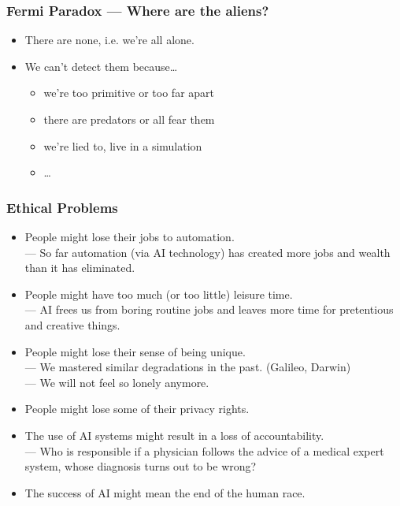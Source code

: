 \documentclass[UTF8,11pt,colorlinks,compress,openany]{beamer}%
\begin{document}
\begin{frame}\frametitle{Fermi Paradox --- Where are the aliens?}
\begin{itemize}
	\item There are none, i.e. we're all alone.
	\item We can't detect them because\dots
		\begin{itemize}
			\item we're too primitive or too far apart
			\item there are predators or all fear them
			\item we're lied to, live in a simulation
			\item \dots
		\end{itemize}
\end{itemize}
\end{frame}

\begin{frame}\frametitle{Ethical Problems}
\begin{itemize}
	\item People might lose their jobs to automation.\\
	--- So far automation (via AI technology) has created more jobs and wealth than it has eliminated.
	\item People might have too much (or too little) leisure time.\\
	--- AI frees us from boring routine jobs and leaves more time for pretentious and creative things.
	\item People might lose their sense of being unique.\\
	--- We mastered similar degradations in the past. (Galileo, Darwin)\\
	--- We will not feel so lonely anymore.
	\item People might lose some of their privacy rights.
	\item The use of AI systems might result in a loss of accountability.\\
	--- Who is responsible if a physician follows the advice of a medical expert system, whose diagnosis turns out to be wrong?
	\item The success of AI might mean the end of the human race.
\end{itemize}
\end{frame}
\end{document}
